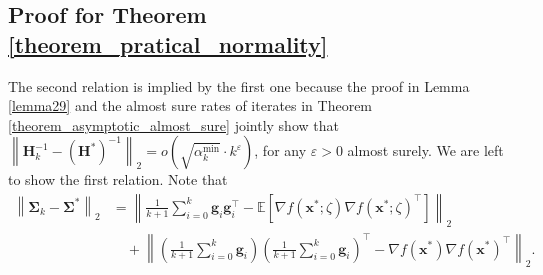 \documentclass[aos]{imsart}
\numberwithin{equation}{section}
\theoremstyle{plain}
\begin{document}
\begin{appendix}
\subsection{Proof for Theorem \ref{theorem_pratical_normality}}
The second relation is implied by the first one because the proof in Lemma \ref{lemma29} and the almost sure rates of iterates in Theorem \ref{theorem_asymptotic_almost_sure} jointly show that $\left\|\bm{H}_k^{-1} - \left(\bm{H}^{*}\right)^{-1} \right\|_2 = o\left(\sqrt{\alpha^{\min}_k} \cdot k^{\varepsilon} \right)$,
    for any $\varepsilon > 0$ almost surely. We are left to show the first relation. Note that
    \begin{equation*}
        \begin{split}
             \left\| \bm{\Sigma}_{k} - \bm{\Sigma}^{*} \right\|_2 & = \left\|  \frac{1}{k+1}\sum_{i=0}^{k} \bm{g}_i  \bm{g}_i^{\top} - \mathbb{E} \left[ \nabla f(\bm{x}^{*};\zeta)   \nabla f(\bm{x}^{*};\zeta)^{\top} \right]\right\|_2 \\
             & \hspace{1em} + \left\| \left( \frac{1}{k+1}\sum_{i=0}^{k} \bm{g}_i\right)\left( \frac{1}{k+1}\sum_{i=0}^{k} \bm{g}_i\right)^{\top} - \nabla f(\bm{x}^{*})\nabla f(\bm{x}^{*})^{\top}\right\|_2.
        \end{split}
    \end{equation*}


\end{appendix}
\end{document}
